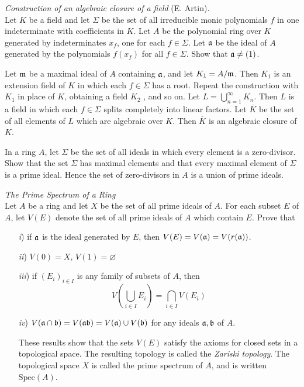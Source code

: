 \documentclass[10pt]{amsart}
\begin{document}
\begin{exercise}\emph{Construction of an algebraic closure of a field} (E. Artin).\\
    Let $K$ be a field and let $\Sigma$ be the set of all irreducible monic 
    polynomials $f$ in one indeterminate with coefficients in $K$. 
    Let $A$ be the polynomial ring over $K$ generated by indeterminates 
    $x_f$, one for each $f \in \Sigma$. Let $\mathfrak{a}$ be the ideal of $A$ 
    generated by the polynomials $f(x_f)$ for all $f \in \Sigma$. 
    Show that $\mathfrak{a} \ne (1)$. 

    Let $\mathfrak{m}$ be a maximal ideal of $A$ containing $\mathfrak{a}$, and let 
    $K_1 = A/\mathfrak{m}$. Then $K_1$ is an extension field of $K$ in which 
    each $f \in \Sigma$ has a root. Repeat the construction with $K_1$ in place 
    of $K$, obtaining a field $K_2$ , and so on. Let $L = \bigcup_{n=1}^{\infty} K_n$.
    Then $L$ is a field in which each $f \in \Sigma$ splits completely into linear factors. 
    Let $\overline{K}$ be the set of all elements of $L$ which are algebraic over $K$. 
    Then $\overline{K}$ is an algebraic closure of $K$.
\end{exercise}

\begin{exercise}
    In a ring $A$, let $\Sigma$ be the set of all ideals in which every element is a zero-divisor. 
    Show that the set $\Sigma$ has maximal elements and that every maximal element of $\Sigma$ is a prime ideal. 
    Hence the set of zero-divisors in $A$ is a union of prime ideals.
\end{exercise}

\begin{exercise}\emph{The Prime Spectrum of a Ring}\\
    Let $A$ be a ring and let $X$ be the set of all prime ideals of $A$. For each subset
    $E$ of $A$, let $V(E)$ denote the set of all prime ideals of $A$ which contain $E$. 
    Prove that 
    \begin{itemize}
        \item[\emph{i})] if $\mathfrak{a}$ is the ideal generated by $E$, then $V(E) = V(\mathfrak{a}) = V(r(\mathfrak{a}))$.
        \item[\emph{ii})] $V(0) = X$, $V(1) = \varnothing$
        \item[\emph{iii})] if $(E_i)_{i \in I}$ is any family of subsets of $A$, then
        \[
            V\left( \bigcup_{i \in I}E_i \right) = \bigcap_{i \in I}V(E_i)
        \] 
        \item[\emph{iv})] $V(\mathfrak{a} \cap \mathfrak{b}) = V(\mathfrak{a}\mathfrak{b}) = V(\mathfrak{a})\cup V(\mathfrak{b})$ 
        for any ideals $\mathfrak{a}, \mathfrak{b}$ of $A$.

        These results show that the sets $V(E)$ satisfy the axioms for closed sets in a topological space. 
        The resulting topology is called the \emph{Zariski topology}. The topological space 
        $X$ is called the prime spectrum of $A$, and is written $\text{Spec}(A)$.
    \end{itemize}
\end{exercise}
\end{document}
